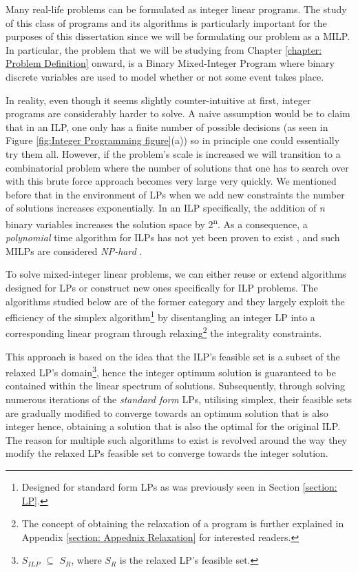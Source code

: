 \vspace{\baselineskip}
\noindent
Many real-life problems can be formulated as integer linear programs. The study of this class of programs and its algorithms is particularly important for the purposes of this dissertation since we will be formulating our problem as a MILP. In particular, the problem that we will be studying from Chapter \ref{chapter: Problem Definition} onward, is a Binary Mixed-Integer Program where binary discrete variables are used to model whether or not some event takes place.\par

 \vspace{\baselineskip}
\noindent
In reality, even though it seems slightly counter-intuitive at first, integer programs are considerably harder to solve. A naive assumption would be to claim that in an ILP, one only has a finite number of possible decisions (as seen in Figure \ref{fig:Integer Programming figure}(a)) so in principle one could essentially try them all. However, if the problem's scale is increased we will transition to a combinatorial problem where the number of solutions that one has to search over with this brute force approach becomes very large very quickly. We mentioned before that in the environment of LPs when we add new constraints the number of solutions increases exponentially. In an ILP specifically, the addition of \textit{n} binary variables increases the solution space by 2\textsuperscript{n}. As a consequence, a \textit{polynomial }time algorithm for ILPs has not yet been proven to exist \cite{DUMMY:2}, and such MILPs are considered \textit{NP-hard} \cite{Wedelin1995}.

\vspace{\baselineskip}
\noindent
To solve mixed-integer linear problems, we can either reuse or extend algorithms designed for LPs or construct new ones specifically for ILP problems. The algorithms studied below are of the former category and they largely exploit the efficiency of the simplex algorithm\footnote{Designed for standard form LPs as was previously seen in Section \ref{section: LP}.} by disentangling an integer LP into a corresponding linear program through relaxing\footnote{The concept of obtaining the relaxation of a program is further explained in Appendix \ref{section: Appednix Relaxation} for interested readers.} the integrality constraints. 

\vspace{\baselineskip}
\noindent
This approach is based on the idea that the ILP’s feasible set is a subset of the relaxed LP’s domain\footnote{$S_{ILP}$ $\subseteq$ $S_{R}$, where $S_{R}$ is the relaxed LP's feasible set.}, hence the integer optimum solution is guaranteed to be contained within the linear spectrum of solutions. Subsequently, through solving numerous iterations of the \textit{standard form} LPs, utilising simplex, their feasible sets are gradually modified to converge towards an optimum solution that is also integer hence, obtaining a solution that is also the optimal for the original ILP. The reason for multiple such algorithms to exist is revolved around the way they modify the relaxed LPs feasible set to converge towards the integer solution. \par

